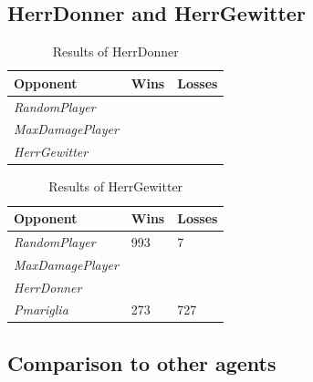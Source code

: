 \subsection{HerrDonner and HerrGewitter}
\begin{table}[h]
    \centering
    \begin{tabular}{|l|l|l|}
    \hline 
    \textbf{Opponent}      & Wins & Losses \\
    \hline 
    \emph{RandomPlayer}    &      &        \\
    \hline 
    \emph{MaxDamagePlayer} &      &        \\
    \hline 
    \emph{HerrGewitter}    &      &        \\
    \hline 
    \end{tabular}
    \caption{Results of HerrDonner}
    \label{tab:HerrDonner}
\end{table}
\begin{table}[h]
    \centering
    \begin{tabular}{|l|l|l|}
    \hline 
    \textbf{Opponent}      & Wins   & Losses \\
    \hline 
    \emph{RandomPlayer}    & 993    & 7 \\
    \hline 
    \emph{MaxDamagePlayer} &        &        \\
    \hline 
    \emph{HerrDonner}       &       &        \\
    \hline 
    \emph{Pmariglia}        & 273   & 727 \\
    \hline
    \end{tabular}
    \caption{Results of HerrGewitter}
    \label{tab:HerrGewitter}
\end{table}

\subsection{Comparison to other agents}

